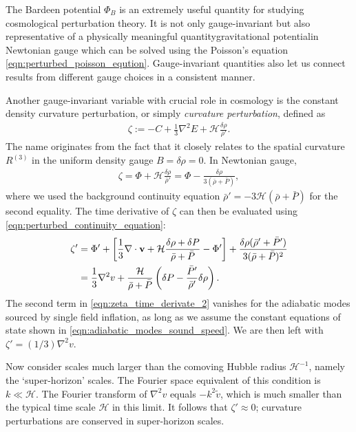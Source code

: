The Bardeen potential $\Phi_B$ is an extremely useful quantity for studying cosmological perturbation theory. It is not only gauge-invariant but also representative of a physically meaningful quantity\textemdash gravitational potential\textemdash in Newtonian gauge which can be solved using the Poisson's equation \eqref{eqn:perturbed_poisson_eqution}. Gauge-invariant quantities also let us connect results from different gauge choices in a consistent manner.

Another gauge-invariant variable with crucial role in cosmology is the constant density curvature perturbation, or simply \textit{curvature perturbation}, defined as
\begin{align}
	\zeta := - C + \frac{1}{3} \nabla^2 E + \mathcal{H} \frac{\delta\rho}{\bar{\rho}'}. \label{def:curvature_perturbation}
\end{align}
The name originates from the fact that it closely relates to the spatial curvature $R^{(3)}$ in the uniform density gauge $B=\delta\rho=0$. In Newtonian gauge,
\begin{align}
	\zeta = \Phi + \mathcal{H}\frac{\delta\rho}{\bar{\rho}'} = \Phi - \frac{\delta\rho}{3(\bar{\rho}+\bar{P})},
\end{align}
where we used the background continuity equation $\bar{\rho}'=-3\mathcal{H}(\bar{\rho}+\bar{P})$ for the second equality. The time derivative of $\zeta$ can then be evaluated using \eqref{eqn:perturbed_continuity_equation}:
\begin{align}
	\zeta' &= \Phi' + \left[ \frac{1}{3}\nabla\cdot\mathbf{v} + \mathcal{H}\frac{\delta\rho + \delta P}{\bar{\rho} + \bar{P}} - \Phi' \right] + \frac{\delta\rho (\bar{\rho}' + \bar{P}')}{3(\bar{\rho}+\bar{P})^2}  \label{eqn:zeta_time_derivate_1} \\
	&= \frac{1}{3}\nabla^2 v + \frac{\mathcal{H}}{\bar{\rho} + \bar{P}} \left( \delta P - \frac{\bar{P}'}{\bar{\rho}'} \delta\rho \right). \label{eqn:zeta_time_derivate_2}
\end{align}
The second term in \eqref{eqn:zeta_time_derivate_2} vanishes for the adiabatic modes sourced by single field inflation, as long as we assume the constant equations of state shown in \eqref{eqn:adiabatic_modes_sound_speed}. We are then left with $\zeta' = (1/3) \nabla^2 v$.

Now consider scales much larger than the comoving Hubble radius $\mathcal{H}^{-1}$, namely the `super-horizon' scales. The Fourier space equivalent of this condition is $k \ll \mathcal{H}$. The Fourier transform of $\nabla^2 v$ equals $-k^2 \tilde{v}$, which is much smaller than the typical time scale $\mathcal{H}$ in this limit. It follows that $\zeta'\approx 0$; curvature perturbations are conserved in super-horizon scales.

